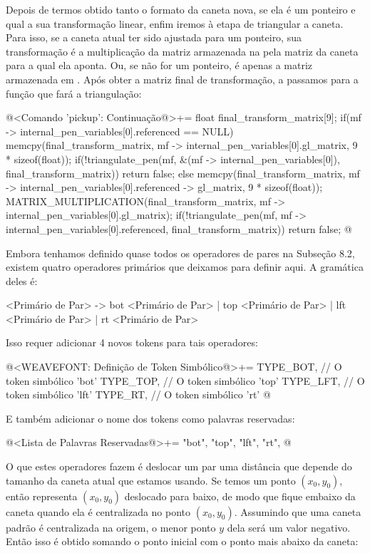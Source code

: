 {{{{{{Depois de termos obtido tanto o formato da caneta nova, se ela é um
ponteiro e qual a sua transformação linear, enfim iremos à etapa de
triangular a caneta. Para isso, se a caneta atual ter sido ajustada
para um ponteiro, sua transformação é a multiplicação da matriz
armazenada na  pela matriz da caneta para a
qual ela aponta. Ou, se não for um ponteiro, é apenas a matriz
armazenada em . Após obter a matriz final de
transformação, a passamos para a função que fará a triangulação:

\iniciocodigo
@<Comando 'pickup': Continuação@>+=
{
  float final_transform_matrix[9];
  if(mf -> internal_pen_variables[0].referenced == NULL){
    memcpy(final_transform_matrix, mf -> internal_pen_variables[0].gl_matrix,
           9 * sizeof(float));
    if(!triangulate_pen(mf, &(mf -> internal_pen_variables[0]),
                        final_transform_matrix))
      return false;
  }
  else{
    memcpy(final_transform_matrix,
           mf -> internal_pen_variables[0].referenced -> gl_matrix,
           9 * sizeof(float));
    MATRIX_MULTIPLICATION(final_transform_matrix,
                          mf -> internal_pen_variables[0].gl_matrix);
    if(!triangulate_pen(mf, mf -> internal_pen_variables[0].referenced,
                        final_transform_matrix))
      return false;
  }
}
@
\fimcodigo


Embora tenhamos definido quase todos os operadores de pares na
Subseção 8.2, existem quatro operadores primários que deixamos para
definir aqui. A gramática deles é:

\alinhaverbatim
<Primário de Par> -> bot <Primário de Par> | top <Primário de Par> |
                     lft <Primário de Par> | rt <Primário de Par>
\alinhanormal

Isso requer adicionar 4 novos tokens para tais operadores:

\iniciocodigo
@<WEAVEFONT: Definição de Token Simbólico@>+=
TYPE_BOT,  // O token simbólico 'bot'
TYPE_TOP,  // O token simbólico 'top'
TYPE_LFT,  // O token simbólico 'lft'
TYPE_RT,   // O token simbólico 'rt'
@
\fimcodigo

E também adicionar o nome dos tokens como palavras reservadas:

\iniciocodigo
@<Lista de Palavras Reservadas@>+=
"bot", "top", "lft", "rt",
@
\fimcodigo

O que estes operadores fazem é deslocar um par uma distância que
depende do tamanho da caneta atual que estamos usando.  Se temos um
ponto $(x_0, y_0)$, então  representa $(x_0,
y_0)$ deslocado para baixo, de modo que fique embaixo da caneta quando
ela é centralizada no ponto $(x_0, y_0)$. Assumindo que uma caneta
padrão é centralizada na origem, o menor ponto $y$ dela será um valor
negativo. Então isso é obtido somando o ponto inicial com o ponto mais
abaixo da caneta:

}}}}}}

